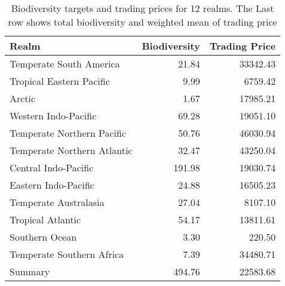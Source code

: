 \begin{table}

\caption{\label{tab:rlm-trading-prices}Biodiversity targets and trading prices for 12 realms. The Last row shows total biodiversity and weighted mean of trading price}
\centering
\begin{tabular}[t]{l|r|r}
\hline
Realm & Biodiversity & Trading Price\\
\hline
Temperate South America & 21.84 & 33342.43\\
\hline
Tropical Eastern Pacific & 9.99 & 6759.42\\
\hline
Arctic & 1.67 & 17985.21\\
\hline
Western Indo-Pacific & 69.28 & 19051.10\\
\hline
Temperate Northern Pacific & 50.76 & 46030.94\\
\hline
Temperate Northern Atlantic & 32.47 & 43250.04\\
\hline
Central Indo-Pacific & 191.98 & 19030.74\\
\hline
Eastern Indo-Pacific & 24.88 & 16505.23\\
\hline
Temperate Australasia & 27.04 & 8107.10\\
\hline
Tropical Atlantic & 54.17 & 13811.61\\
\hline
Southern Ocean & 3.30 & 220.50\\
\hline
Temperate Southern Africa & 7.39 & 34480.71\\
\hline
Summary & 494.76 & 22583.68\\
\hline
\end{tabular}
\end{table}